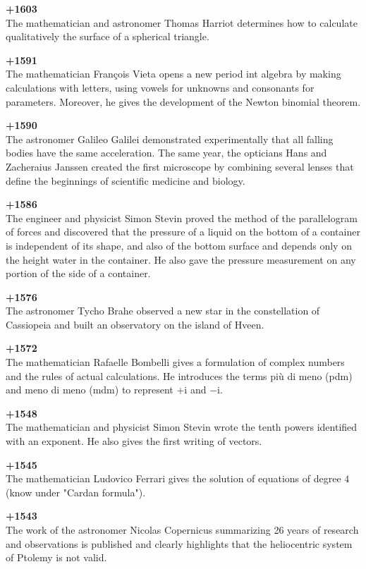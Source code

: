 \textbf{+1603}\\
The mathematician and astronomer Thomas Harriot determines how to calculate qualitatively the surface of a spherical triangle.

\textbf{+1591}\\
The mathematician François Vieta opens a new period int algebra by making calculations with letters, using vowels for unknowns and consonants for parameters. Moreover, he gives the development of the Newton binomial theorem.

\textbf{+1590}\\
The astronomer Galileo Galilei demonstrated experimentally that all falling bodies have the same acceleration. The same year, the opticians Hans and Zacheraius Janssen created the first microscope by combining several lenses that define the beginnings of scientific medicine and biology.

\textbf{+1586}\\
The engineer and physicist Simon Stevin proved the method of the parallelogram of forces and discovered that the pressure of a liquid on the bottom of a container is independent of its shape, and also of the bottom surface and depends only on the height water in the container. He also gave the pressure measurement on any portion of the side of a container.

\textbf{+1576}\\
The astronomer Tycho Brahe observed a new star in the constellation of Cassiopeia and built an observatory on the island of Hveen.

\textbf{+1572}\\
The mathematician Rafaelle Bombelli gives a formulation of complex numbers and the rules of actual calculations. He introduces the terms più di meno (pdm) and meno di meno (mdm) to represent $+\mathrm{i}$ and $-\mathrm{i}$.

\textbf{+1548}\\
The mathematician and physicist Simon Stevin wrote the tenth powers identified with an exponent. He also gives the first writing of vectors. 

\textbf{+1545}\\
The mathematician Ludovico Ferrari gives the solution of equations of degree $4$ (know under "Cardan formula").

\textbf{+1543}\\
The work of the astronomer Nicolas Copernicus summarizing 26 years of research and observations is published and clearly highlights that the heliocentric system of Ptolemy is not valid.

